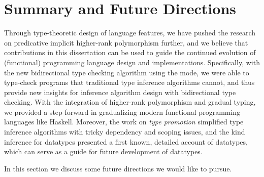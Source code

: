 \chapter{Summary and Future Directions}
\label{chap:future}

Through type-theoretic design of language features, we have pushed the research
on predicative implicit higher-rank polymorphism further, and we believe that
contributions in this dissertation can be used to guide the continued evolution
of (functional) programming language design and implementations. Specifically,
with the new bidirectional type checking algorithm using the \mode mode, we were
able to type-check programs that traditional type inference algorithms cannot,
and thus provide new insights for inference algorithm design with bidirectional
type checking. With the integration of higher-rank polymorphism and gradual
typing, we provided a step forward in gradualizing modern functional programming
languages like Haskell. Moreover, the work on \textit{type promotion} simplified
type inference algorithms with tricky dependency and scoping issues, and the
kind inference for datatypes presented a first known, detailed account of
datatypes, which can serve as a guide for future development of datatypes.

In this section we discuss some future directions we would like to pursue.




